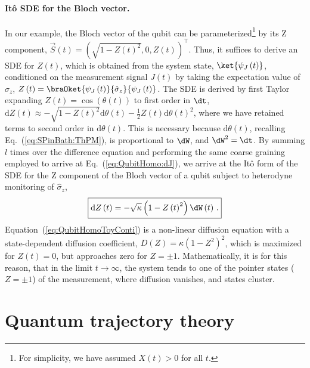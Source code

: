 \paragraph{Itô SDE for the Bloch vector. }

In our example, the Bloch vector of the qubit can be parameterized\footnote{For simplicity, we have assumed $X\left(t\right)>0$ for all $t$.}
by its Z component, $\vec{S}\left(t\right)=\left(\sqrt{1-Z\left(t\right)^{2}},0,Z\left(t\right)\right)^{\intercal}$.
Thus, it suffices to derive an SDE for $Z\left(t\right)$, which is
obtained from the system state, $\ket{\psi_{J}\left(t\right)}$, conditioned
on the measurement signal $J\left(t\right)$ by taking the expectation
value of $\hat{\sigma}_{z}$, $Z\left(t\right)=\braOket{\psi_{J}\left(t\right)}{\hat{\sigma}_{z}}{\psi_{J}\left(t\right)}$.
The SDE is derived by first Taylor expanding $Z\left(t\right)=\cos\left(\theta\left(t\right)\right)$
to first order in $\dt$, $\mathrm{d}Z\left(t\right)\approx-\sqrt{1-Z\left(t\right)^{2}}\mathrm{d}\theta\left(t\right)-\frac{1}{2}Z\left(t\right)\mathrm{d}\theta\left(t\right)^{2}$,
where we have retained terms to second order in $\mathrm{d}\theta\left(t\right)$.
This is necessary because $\mathrm{d}\theta\left(t\right)$, recalling
Eq.~(\ref{eq:SPinBath:ThPM}), is proportional to $\dW$, and $\dW^{2}=\dt$.
By summing $l$ times over the difference equation and performing
the same coarse graining employed to arrive at Eq.~(\ref{eq:QubitHomo:dJ}),
we arrive at the Itô form of the SDE for the Z component of the Bloch
vector of a qubit subject to heterodyne monitoring of $\hat{\sigma}_{z}$,
\begin{equation}
\boxed{\mathrm{d}Z\left(t\right)=-\sqrt{\kappa}\left(1-Z\left(t\right)^{2}\right)\dW\left(t\right)\,.}\label{eq:QubitHomoToyConti}
\end{equation}
Equation~(\ref{eq:QubitHomoToyConti}) is a non-linear diffusion
equation with a state-dependent diffusion coefficient, $D\left(Z\right)=\kappa\left(1-Z^{2}\right)^{2}$,
which is maximized for $Z\left(t\right)=0$, but approaches zero for
$Z=\pm1$. Mathematically, it is for this reason, that in the limit
$t\rightarrow\infty$, the system tends to one of the pointer states
($Z=\pm1$) of the measurement, where diffusion vanishes, and states
cluster. 


\section{Quantum trajectory theory \label{sec:Quantum-trajectory-theory}}

